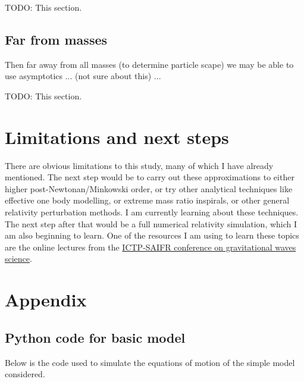 \documentclass{article}
\begin{document}
TODO: This section.

\subsection{Far from masses}

Then far away from all masses (to determine particle scape) we may be able to use asymptotics ... (not sure about this) ...

TODO: This section.


\section{Limitations and next steps}\label{sec:Limitations and next steps}

There are obvious limitations to this study, many of which I have already mentioned. The next step would be to carry out these approximations to either higher post-Newtonan/Minkowski order, or try other analytical techniques like effective one body modelling, or extreme mass ratio inspirals, or other general relativity perturbation methods. I am currently learning about these techniques. The next step after that would be a full numerical relativity simulation, which I am also beginning to learn. One of the resources I am using to learn these topics are the online lectures from the \href{https://www.ictp-saifr.org/the-sound-of-space-time-the-dawn-of-gravitational-wave-science/}{ICTP-SAIFR conference on gravitational waves science}.



\section{Appendix}\label{sec:Appendix}

\subsection{Python code for basic model}\label{sec:Python code}

Below is the code used to simulate the equations of motion of the simple model considered.
\end{document}
